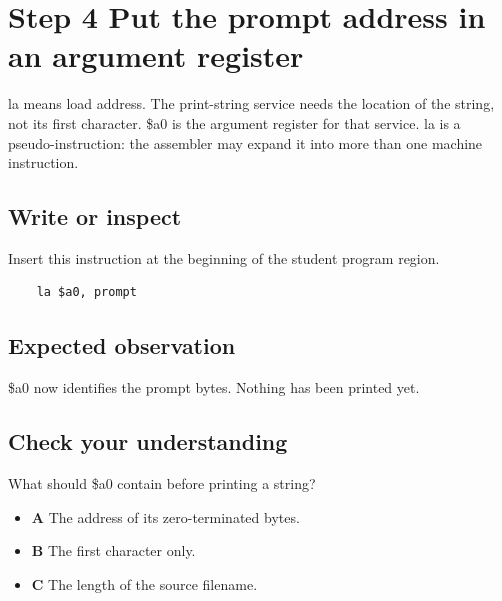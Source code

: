 \section{Step 4 Put the prompt address in an argument
  register}\label{001-console-calculation-s04-step-4-put-the-prompt-address-in-an-argument-register}

la means load address. The print-string service needs the location of
the string, not its first character. \$a0 is the argument register for
that service. la is a pseudo-instruction: the assembler may expand it
into more than one machine instruction.

\subsection{Write or
  inspect}\label{001-console-calculation-s04-write-or-inspect}

Insert this instruction at the beginning of the student program region.

\begin{verbatim}
    la $a0, prompt
\end{verbatim}

\subsection{Expected
  observation}\label{001-console-calculation-s04-expected-observation}

\$a0 now identifies the prompt bytes. Nothing has been printed yet.

\subsection{Check your
  understanding}\label{001-console-calculation-s04-check-your-understanding}

What should \$a0 contain before printing a string?

\begin{itemize}
  \tightlist
  \item
        \textbf{A} The address of its zero-terminated bytes.
  \item
        \textbf{B} The first character only.
  \item
        \textbf{C} The length of the source filename.
\end{itemize}
